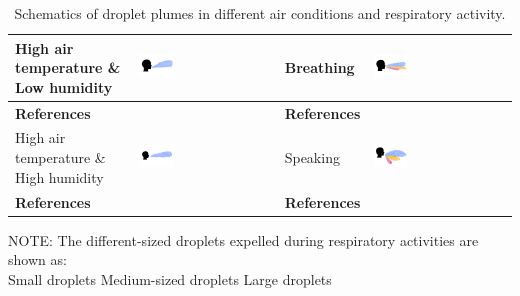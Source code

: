 \documentclass[a4paper,12pt]{elsarticle}
\DeclareRobustCommand{\legendsquare}[1]{%
  \tikz[baseline=(a.south)]{\node[#1, inner sep=.8ex, outer sep=0] (a) {};}%
  }
\begin{document}
\begin{table}[h!]
\begin{tabular}{|m{2.5cm}|m{4cm}||m{2.5cm}|m{4cm}|}
    \hline
    High air temperature \& Low humidity & \includegraphics[clip,trim={0 2cm 0 2cm},width=0.25\textwidth]{Droplets/dropmat3.jpeg}& Breathing & \includegraphics[clip,trim={0 2cm 0 2cm},width=0.25\textwidth]{Droplets/dropmat7.jpeg} \\
    \hline
    \textbf{References} & \cite{zhang2019distribution,feng2020study,sen2021transmission} & \textbf{References} & \cite{he2011cfd,villafruela2019assessment,duill2021impact,shao2021risk,luo2022role,wang2022evaluation,wei2023effects} \\
    \hline
   High air temperature \& High humidity & \includegraphics[clip,trim={0 2cm 0 2cm},width=0.25\textwidth]{Droplets/dropmat4.jpeg}& Speaking & \includegraphics[clip,trim={0 2cm 0 2cm},width=0.25\textwidth]{Droplets/dropmat8.jpeg} \\
    \hline
    \textbf{References} & \cite{zhang2019distribution,chong2021extended} & \textbf{References} & \cite{vuorinen2020modelling,zhou2021experimental,wang2022evaluation,wei2023effects} \\
    \hline
    \end{tabular}
    \caption{Schematics of droplet plumes in different air conditions and respiratory activity.}
    \label{tab:mat2}
    \vspace{0.3cm}
    \normalsize
    NOTE: The different-sized droplets expelled during respiratory activities are shown as:\\ \legendsquare{fill=resp} Small droplets \legendsquare{fill=vent} Medium-sized droplets \legendsquare{fill=therm} Large droplets 
\end{table}
\end{document}
